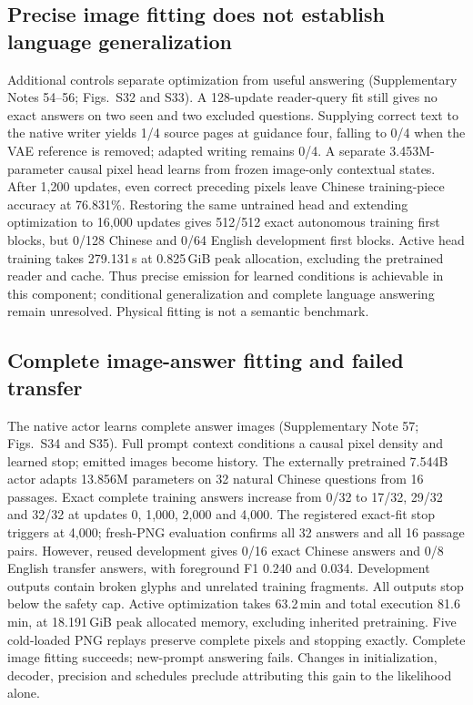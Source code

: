 \documentclass[12pt,a4paper]{article}
\begin{document}
\subsection*{Precise image fitting does not establish language generalization}
Additional controls separate optimization from useful answering
(Supplementary Notes 54--56; Figs.~S32 and S33). A 128-update reader-query fit
still gives no exact answers on two seen and two excluded questions.
Supplying correct text to the native writer yields 1/4 source pages at
guidance four, falling to 0/4 when the VAE reference is removed; adapted
writing remains 0/4. A separate 3.453M-parameter causal pixel head learns
from frozen image-only contextual states. After 1,200 updates, even correct
preceding pixels leave Chinese training-piece accuracy at 76.831\%.
Restoring the same untrained head and extending optimization to 16,000
updates gives 512/512 exact autonomous training first blocks, but 0/128
Chinese and 0/64 English development first blocks. Active head training
takes 279.131\,s at 0.825\,GiB peak allocation, excluding the pretrained
reader and cache. Thus precise emission for learned conditions is achievable
in this component; conditional generalization and complete language answering
remain unresolved. Physical fitting is not a semantic benchmark.


\subsection*{Complete image-answer fitting and failed transfer}
The native actor learns complete answer images
(Supplementary Note 57; Figs.~S34 and S35). Full prompt context conditions a
causal pixel density and learned stop; emitted images become history.
The externally pretrained 7.544B actor adapts 13.856M parameters on 32 natural
Chinese questions from 16 passages. Exact complete training answers increase
from 0/32 to 17/32, 29/32 and 32/32 at updates 0, 1,000, 2,000 and 4,000.
The registered exact-fit stop triggers at 4,000; fresh-PNG evaluation confirms
all 32 answers and all 16 passage pairs. However, reused development gives
0/16 exact Chinese answers and 0/8 English transfer answers, with foreground
F1 0.240 and 0.034. Development outputs contain broken glyphs and unrelated
training fragments. All outputs stop below the
safety cap. Active optimization takes 63.2\,min and total execution 81.6\,min,
at 18.191\,GiB peak allocated memory, excluding inherited pretraining.
Five cold-loaded PNG replays preserve complete pixels and stopping exactly.
Complete image fitting succeeds; new-prompt answering fails.
Changes in initialization, decoder, precision and schedules preclude attributing
this gain to the likelihood alone.
\end{document}
